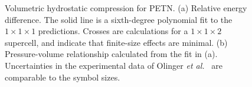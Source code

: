 \documentclass[prb,aps,nobibnotes,twocolumn,doublespace,twocolumngrid,superbib]{revtex4}
\begin{document}
\begin{figure}
\caption{Volumetric hydrostatic compression for PETN.
(a) Relative energy difference. The solid line is a sixth-degree
polynomial fit to the $1\times 1\times 1$ predictions.  Crosses are
calculations for a $1\times 1\times 2$ supercell, and indicate that
finite-size effects are minimal.  (b) Pressure-volume relationship
calculated from the fit in (a).  Uncertainties in the experimental
data of Olinger {\it et al.}~\cite{Olinger_1975v62} are comparable to 
the symbol sizes.  }
\label{fig:volume_compress}
\end{figure}
\end{document}
